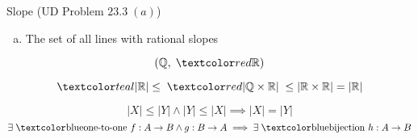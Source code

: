 % 
% 

\begin{frame}{}
  \begin{exampleblock}{Slope (UD Problem $23.3 \;(a)$)}
    \begin{enumerate}[(a)]
      \item The set of all lines with rational slopes
    \end{enumerate}
  \end{exampleblock}

  \pause
  \[
    (\Q, \;\red{\R})
  \]

  \pause
  \[
    \teal{|\R| \le \;\red{|\Q \times \R|}\; \le |\R \times \R| = |\R|}
  \]
\end{frame}

\begin{frame}{}
  \begin{center}
    {\large {}}
  \end{center}

  \pause
  \vspace{0.30cm}
  \begin{theorem}
    \[
      |X| \le |Y| \land |Y| \le |X| \implies |X| = |Y|
    \]
    \pause
    \[
      \exists\; \text{\blue{one-to-one} } f: A \to B \land g: B \to A \implies \exists\; \text{\blue{bijection} } h: A \to B
    \]
  \end{theorem}

  \pause
  \begin{columns}
      \pause
      \pause
      \vspace{-0.60cm}
      \begin{center}
	{}
      \end{center}
  \end{columns}
\end{frame}

